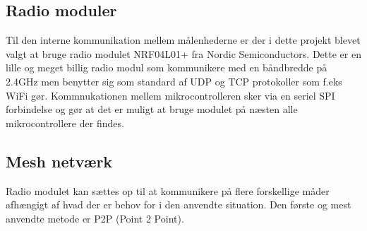 \subsection{Radio moduler}
Til den interne kommunikation mellem målenhederne er der i dette projekt blevet valgt at bruge radio modulet NRF04L01+ fra Nordic Semiconductors.
\newline
Dette er en lille og meget billig radio modul som kommunikere med en båndbredde på 2.4GHz men benytter sig som standard af UDP og TCP protokoller som f.eks WiFi gør. 
Kommnukationen mellem mikrocontrolleren sker via en seriel SPI forbindelse og gør at det er muligt at bruge modulet på næsten alle mikrocontrollere der findes.

\subsection{Mesh netværk}
Radio modulet kan sættes op til at kommunikere på flere forskellige måder afhængigt af hvad der er behov for i den anvendte situation.
Den første og mest anvendte metode er P2P (Point 2 Point).